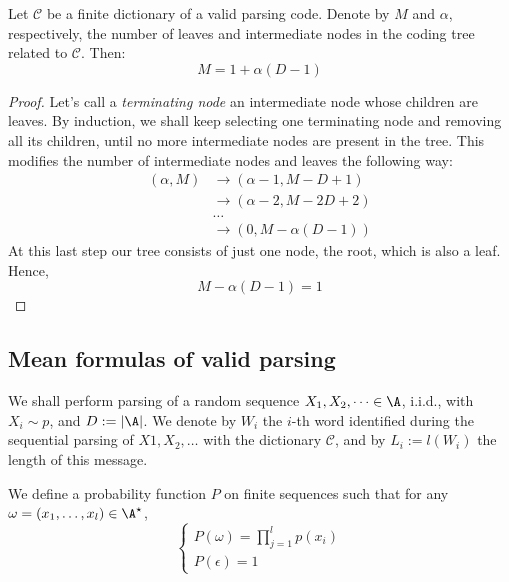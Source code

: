 \documentclass[toc, titlepaged]{../cs-classes/cs-classes}
\begin{document}
\begin{lemma}
    \label{lem:node-conservation}
    Let $\mathcal{C}$ be a finite dictionary of a valid parsing code. Denote by $M$ and $\alpha$, respectively, the number of leaves and intermediate nodes in the coding tree related to $\mathcal{C}$. Then:
    \begin{equation*}
        M = 1 + \alpha(D-1)
    \end{equation*}
\end{lemma}
\begin{proof}
    Let's call a \emph{terminating node} an intermediate node whose children are leaves. By induction, we shall keep selecting one terminating node and removing all its children, until no more intermediate nodes are present in the tree. This modifies the number of intermediate nodes and leaves the following way:
    \begin{equation*}
        \begin{aligned}
            (\alpha, M) &\longrightarrow (\alpha-1, M-D+1)\\
            &\longrightarrow (\alpha-2, M-2D+2)\\
            &\dots\\
            &\longrightarrow (0, M-\alpha(D-1))
        \end{aligned}
    \end{equation*}
    At this last step our tree consists of just one node, the root, which is also a leaf. Hence,
    \begin{equation*}
        M-\alpha(D-1) = 1
    \end{equation*}
\end{proof}

\subsection{Mean formulas of valid parsing}
We shall perform parsing of a random sequence $X_1, X_2, \dots \in \A$, i.i.d., with $X_i \sim p$, and $D:=|\A|$. We denote by $W_i$ the $i$-th word identified during the sequential parsing of $X1, X_2, \dots$ with the dictionary $\mathcal{C}$, and by $L_i := l(W_i)$ the length of this message.

\begin{definition}
    We define a probability function $P$ on finite sequences such that for any $\omega = (x_1, \dots, x_l)\in\A^\star$,
    \begin{equation*}
        \begin{cases}
            P(\omega) = \prod_{j=1}^l p(x_i)\\
            P(\epsilon) = 1
        \end{cases}
    \end{equation*}
\end{definition}
\end{document}
